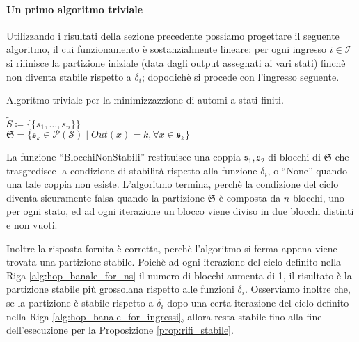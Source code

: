 \paragraph{Un primo algoritmo triviale} Utilizzando i risultati della sezione precedente possiamo progettare il seguente algoritmo, il cui funzionamento è sostanzialmente lineare: per ogni ingresso $i \in \mathcal{I}$ si rifinisce la partizione iniziale (data dagli output assegnati ai vari stati) finchè non diventa stabile rispetto a $\delta_i$; dopodichè si procede con l'ingresso seguente.

\begin{algorithm}[t]
    \caption{Algoritmo triviale per la minimizzazzione di automi a stati finiti.}
    \label{alg:hop_banale}
    \SetAlgoLined
    \KwData{\argsautomata}
    \nl$\widetilde{S} \coloneqq \{\{s_1, \dots, s_n\}\}$\;
    \\
    $\mathfrak{S} = \{\mathfrak{s}_k \in \mathcal{P}(\mathcal{S}) \mid Out(x) = k, \forall x \in \mathfrak{s}_k\}$\;\label{alg:hop_banale_partiziona_output}
     {
        \label{alg:hop_banale_for_ingressi}
    }
\end{algorithm}
La funzione ``BlocchiNonStabili'' restituisce una coppia $\mathfrak{s}_1, \mathfrak{s}_2$ di blocchi di $\mathfrak{S}$ che trasgredisce la condizione di stabilità rispetto alla funzione $\delta_i$, o ``None'' quando una tale coppia non esiste. L'algoritmo termina, perchè la condizione del ciclo diventa sicuramente falsa quando la partizione $\mathfrak{S}$ è composta da $n$ blocchi, uno per ogni stato, ed ad ogni iterazione un blocco viene diviso in due blocchi distinti e non vuoti.

Inoltre la risposta fornita è corretta, perchè l'algoritmo si ferma appena viene trovata una partizione stabile. Poichè ad ogni iterazione del ciclo definito nella Riga \ref{alg:hop_banale_for_ns} il numero di blocchi aumenta di 1, il risultato è la partizione stabile più grossolana rispetto alle funzioni $\delta_i$. Osserviamo inoltre che, se la partizione è stabile rispetto a $\delta_i$ dopo una certa iterazione del ciclo definito nella Riga \ref{alg:hop_banale_for_ingressi}, allora resta stabile fino alla fine dell'esecuzione per la Proposizione \ref{prop:rifi_stabile}.

